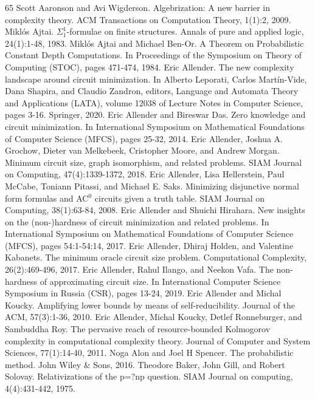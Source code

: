 \documentclass[10pt,a4paper]{article}
\begin{document}
\begin{thebibliography}{65}
 Scott Aaronson and Avi Wigderson. Algebrization: A new barrier in complexity theory. ACM Transactions on Computation Theory, 1(1):2, 2009.
 Miklós Ajtai. $\Sigma^1_1$-formulae on finite structures. Annals of pure and applied logic, 24(1):1-48, 1983.
 Miklós Ajtai and Michael Ben-Or. A Theorem on Probabilistic Constant Depth Computations. In Proceedings of the Symposium on Theory of Computing (STOC), pages 471-474, 1984.
 Eric Allender. The new complexity landscape around circuit minimization. In Alberto Leporati, Carlos Martín-Vide, Dana Shapira, and Claudio Zandron, editors, Language and Automata Theory and Applications (LATA), volume 12038 of Lecture Notes in Computer Science, pages 3-16. Springer, 2020.
 Eric Allender and Bireswar Das. Zero knowledge and circuit minimization. In International Symposium on Mathematical Foundations of Computer Science (MFCS), pages 25-32, 2014.
 Eric Allender, Joshua A. Grochow, Dieter van Melkebeek, Cristopher Moore, and Andrew Morgan. Minimum circuit size, graph isomorphism, and related problems. SIAM Journal on Computing, 47(4):1339-1372, 2018.
 Eric Allender, Lisa Hellerstein, Paul McCabe, Toniann Pitassi, and Michael E. Saks. Minimizing disjunctive normal form formulas and AC$^0$ circuits given a truth table. SIAM Journal on Computing, 38(1):63-84, 2008.
 Eric Allender and Shuichi Hirahara. New insights on the (non-)hardness of circuit minimization and related problems. In International Symposium on Mathematical Foundations of Computer Science (MFCS), pages 54:1-54:14, 2017.
 Eric Allender, Dhiraj Holden, and Valentine Kabanets. The minimum oracle circuit size problem. Computational Complexity, 26(2):469-496, 2017.
 Eric Allender, Rahul Ilango, and Neekon Vafa. The non-hardness of approximating circuit size. In International Computer Science Symposium in Russia (CSR), pages 13-24, 2019.
 Eric Allender and Michal Koucky. Amplifying lower bounds by means of self-reducibility. Journal of the ACM, 57(3):1-36, 2010.
 Eric Allender, Michal Koucky, Detlef Ronneburger, and Sambuddha Roy. The pervasive reach of resource-bounded Kolmogorov complexity in computational complexity theory. Journal of Computer and System Sciences, 77(1):14-40, 2011.
 Noga Alon and Joel H Spencer. The probabilistic method. John Wiley \& Sons, 2016.
 Theodore Baker, John Gill, and Robert Solovay. Relativizations of the p=?np question. SIAM Journal on computing, 4(4):431-442, 1975.

\end{thebibliography}
\end{document}
